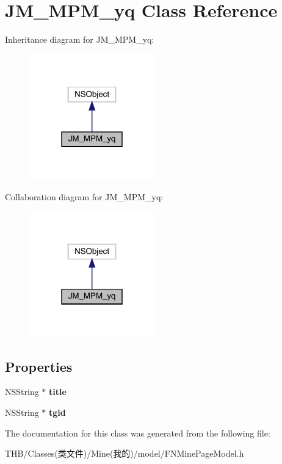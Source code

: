 \hypertarget{interface_j_m___m_p_m__yq}{}\section{J\+M\+\_\+\+M\+P\+M\+\_\+yq Class Reference}
\label{interface_j_m___m_p_m__yq}


Inheritance diagram for J\+M\+\_\+\+M\+P\+M\+\_\+yq\+:\nopagebreak
\begin{figure}[H]
\begin{center}
\leavevmode
\includegraphics[width=154pt]{interface_j_m___m_p_m__yq__inherit__graph}
\end{center}
\end{figure}


Collaboration diagram for J\+M\+\_\+\+M\+P\+M\+\_\+yq\+:\nopagebreak
\begin{figure}[H]
\begin{center}
\leavevmode
\includegraphics[width=154pt]{interface_j_m___m_p_m__yq__coll__graph}
\end{center}
\end{figure}
\subsection*{Properties}
\begin{DoxyCompactItemize}
\item 
\mbox{\label{interface_j_m___m_p_m__yq_aca535a291d18e2b3177b287759284038}} 
N\+S\+String $\ast$ {\bfseries title}
\item 
\mbox{\label{interface_j_m___m_p_m__yq_af35206680275d7de5cacaf55147a4920}} 
N\+S\+String $\ast$ {\bfseries tgid}
\end{DoxyCompactItemize}


The documentation for this class was generated from the following file\+:\begin{DoxyCompactItemize}
\item 
T\+H\+B/\+Classes(类文件)/\+Mine(我的)/model/F\+N\+Mine\+Page\+Model.\+h\end{DoxyCompactItemize}
